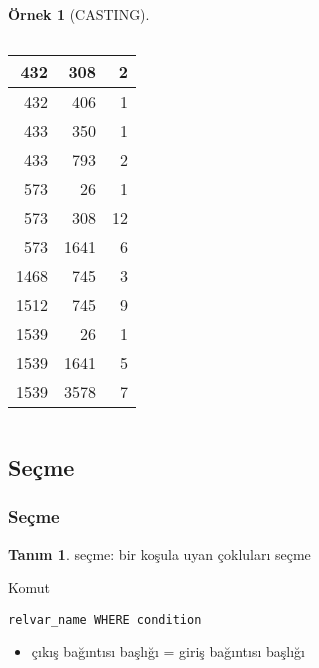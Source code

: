 \documentclass[dvipsnames]{beamer}
\theoremstyle{definition}
\newtheorem{tanim}[theorem]{Tanım}
\theoremstyle{example}
\newtheorem{ornek}[theorem]{Örnek}
\theoremstyle{plain}
\begin{document}
\begin{frame}
\begin{ornek}[CASTING]
\begin{columns}[b]
      \begin{tiny}
      \begin{table}
        \begin{tabular}{|r|r|r|}\hline
    432 &     308 &   2\\\hline
    432 &     406 &   1\\\hline
    433 &     350 &   1\\\hline
    433 &     793 &   2\\\hline
    573 &      26 &   1\\\hline
    573 &     308 &  12\\\hline
    573 &    1641 &   6\\\hline
   1468 &     745 &   3\\\hline
   1512 &     745 &   9\\\hline
   1539 &      26 &   1\\\hline
   1539 &    1641 &   5\\\hline
   1539 &    3578 &   7\\\hline
        \end{tabular}
      \end{table}
      \end{tiny}
    \end{columns}
  \end{ornek}
\end{frame}

\subsection{Seçme}

\begin{frame}[fragile]
  \frametitle{Seçme}

  \begin{tanim}
    \alert{seçme}: bir koşula uyan çokluları seçme
  \end{tanim}

  \pause
  \begin{block}{Komut}
    \begin{lstlisting}
relvar_name WHERE condition
    \end{lstlisting}
  \end{block}

  \pause
  \begin{itemize}
    \item çıkış bağıntısı başlığı = giriş bağıntısı başlığı
  \end{itemize}
\end{frame}
\end{document}
